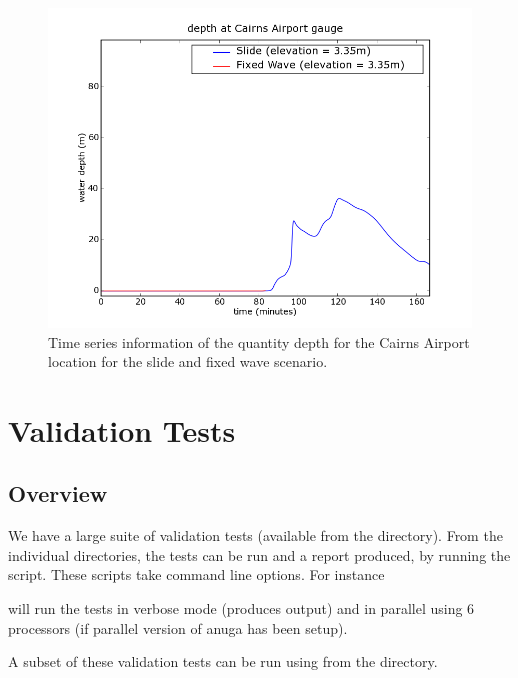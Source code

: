 \documentclass{manual}
\begin{document}
\begin{figure}[htp]
  \centerline{\includegraphics[scale=0.5]{graphics/gaugeCairnsAirportdepth.png}}
  \caption{Time series information of the quantity depth for the Cairns Airport
           location for the slide and fixed wave scenario.}
  \label{fig:airportboth}
\end{figure}



\chapter{\anuga Validation Tests}


\section{Overview}

We have a large suite of validation tests (available from the  directory). From the individual directories, the tests can be run and a report produced, by running the  script. These scripts take command line options. For instance 


will run the tests in verbose mode (produces output) and in parallel using 6 processors (if parallel version of anuga has been setup). 

A subset of these validation tests can be run using  from the  directory. 
\end{document}
